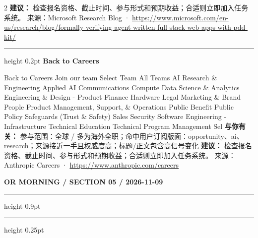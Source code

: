 \documentclass[10.5pt]{ctexart}
\begin{document}
\begin{multicols}{2}
\textbf{建议：} 检查报名资格、截止时间、参与形式和预期收益；合适则立即加入任务系统。
{\footnotesize\color{ormuted} 来源：Microsoft Research Blog · \url{https://www.microsoft.com/en-us/research/blog/formally-verifying-agent-written-full-stack-web-apps-with-pdd-kit/}}
\vspace{2mm}
\hrule height 0.2pt
\vspace{2mm}
{\large\bfseries Back to Careers}\par
Back to Careers Join our team Select Team All Teams AI Research \& Engineering Applied AI Communications Compute Data Science \& Analytics Engineering \& Design - Product Finance Hardware Legal Marketing \& Brand People Product Management, Support, \& Operations Public Benefit Public Policy Safeguards (Trust \& Safety) Sales Security Software Engineering - Infrastructure Technical Education Technical Program Management Sel
\textbf{与你有关：} 参与范围：全球 / 多为海外全职；命中用户订阅版面：opportunity、ai、research；来源接近一手且权威度高；标题/正文包含高信号变化
\textbf{建议：} 检查报名资格、截止时间、参与形式和预期收益；合适则立即加入任务系统。
{\footnotesize\color{ormuted} 来源：Anthropic Careers · \url{https://www.anthropic.com/careers}}
\end{multicols}
\newpage
{\small\bfseries OR MORNING / SECTION 05 / 2026-11-09}
\vspace{2mm}
\hrule height 0.9pt
\vspace{1.5mm}
\hrule height 0.25pt
\vspace{4mm}
\end{document}
